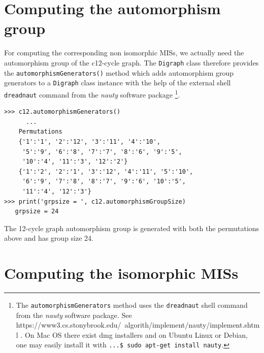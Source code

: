 \section{Computing the automorphism group}
\label{sec:24.2}

For computing the corresponding non isomorphic MISs, we actually need the automorphism group of the c12-cycle graph. The \texttt{Digraph} class therefore provides the \texttt{automorphismGenerators()} method which adds automorphism group generators to a \texttt{Digraph} class instance with the help of the external shell \texttt{dreadnaut} command from the \emph{nauty} software package \footnote{The \texttt{automorphismGenerators} method uses the \texttt{dreadnaut} shell command from the \emph{nauty} software package. See https://www3.cs.stonybrook.edu/~algorith/implement/nauty/implement.shtml . On Mac OS there exist dmg installers and on Ubuntu Linux or Debian, one may easily install it with \texttt{...\$ sudo apt-get install nauty}.}.
\begin{lstlisting}
>>> c12.automorphismGenerators()
      ...
    Permutations
    {'1':'1', '2':'12', '3':'11', '4':'10',
     '5':'9', '6':'8', '7':'7', '8':'6', '9':'5',
     '10':'4', '11':'3', '12':'2'}
    {'1':'2', '2':'1', '3':'12', '4':'11', '5':'10', 
     '6':'9', '7':'8', '8':'7', '9':'6', '10':'5', 
     '11':'4', '12':'3'}
>>> print('grpsize = ', c12.automorphismGroupSize)
   grpsize = 24
\end{lstlisting}
The 12-cycle graph automorphism group is generated with both the permutations above and has group size 24.

\section{Computing the isomorphic MISs}
\label{sec:24.3}

